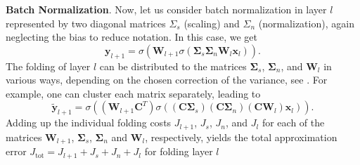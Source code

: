 \documentclass{article}
\newcommand\fakeparagraph[1]{\par\noindent\textbf{{#1}}.\xspace}
\begin{document}
\fakeparagraph{Batch Normalization}
Now, let us consider batch normalization in layer $l$ represented by two diagonal matrices $\Sigma_s$ (scaling) and $\Sigma_n$ (normalization), again neglecting the bias to reduce notation. In this case, we get
\[
    \mathbf{y}_{l+1} = \sigma(\mathbf{W}_{l+1} \sigma(\mathbf{\Sigma}_s \mathbf{\Sigma}_n \mathbf{W}_l \mathbf{x}_l)).
\]
The folding of layer $l$ can be distributed to the matrices $\mathbf{\Sigma}_s$, $\mathbf{\Sigma}_n$, and  $\mathbf{W}_l$ in various ways, depending on the chosen correction of the variance, see . For example, one can cluster each matrix separately, leading to
\[
    \mathbf{\tilde{y}}_{l+1} = \sigma((\mathbf{W}_{l+1} \mathbf{C}^T) \sigma((\mathbf{C} \mathbf{\Sigma}_s) (\mathbf{C} \mathbf{\Sigma}_n) (\mathbf{C} \mathbf{W}_l) \mathbf{x}_l)).
\]
Adding up the individual folding costs $J_{l+1}$, $J_{s}$, $J_{n}$, and $J_{l}$ for each of the matrices $\mathbf{W}_{l+1}$, $\mathbf{\Sigma}_s$, $\mathbf{\Sigma}_n$ and $\mathbf{W}_l$, respectively, yields the total approximation error $J_\text{tot} = J_{l+1} + J_{s} + J_{n} + J_{l}$ for folding layer $l$
\end{document}
